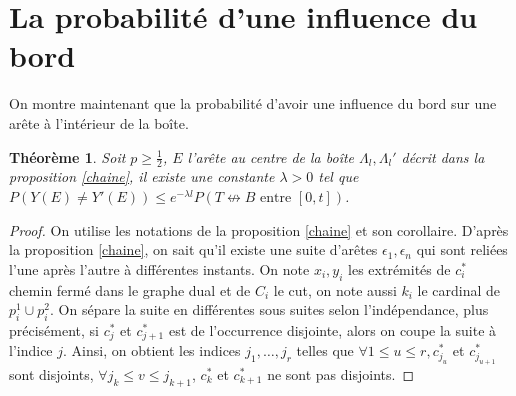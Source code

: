 \documentclass[titlepage,a4paper,11pt]{article}
\newcounter{thm}
\newcounter{prop}
\newcounter{cor}
\newtheorem{cvg}[thm]{Théorème}
\newcommand{\nconnect}{\nleftrightarrow}
\begin{document}
\section{La probabilité d'une influence du bord}

On montre maintenant que la probabilité d'avoir une influence du bord sur une arête à l'intérieur de la boîte. 
\begin{cvg}
Soit $p\geqslant \frac{1}{2}$, $E$ l'arête au centre de la boîte $\Lambda_l, \Lambda_l'$ décrit dans la proposition \ref{chaine}, il existe une constante $\lambda> 0$ tel que $P(Y(E)\neq Y'(E)) \leqslant e^{-\lambda l} P(T\nconnect B \text{ entre }[0,t])$.
\end{cvg}

\begin{proof}

On utilise les notations de la proposition \ref{chaine} et son corollaire.
D'après la proposition \ref{chaine}, on sait qu'il existe une suite d'arêtes $\epsilon_1,\epsilon_n$ qui sont reliées l'une après l'autre à différentes instants. On note $x_i,y_i$ les extrémités de $c_i^*$ chemin fermé dans le graphe dual et de $C_i$ le cut, on note aussi $k_i$ le cardinal de $p_i^1\cup p_i^2$. On sépare la suite en différentes sous suites selon l'indépendance, plus précisément, si $c^*_j$ et $c^*_{j+1}$  est de l'occurrence disjointe, alors on coupe la suite à l'indice $j$. Ainsi, on obtient les indices $j_1,\dots,j_r$ telles que $\forall 1\leqslant u\leqslant r, c^*_{j_u}$ et $c^*_{j_{u+1}}$ sont disjoints, $\forall j_k \leqslant v \leqslant j_{k+1}$, $c_k^*$ et $c_{k+1}^*$ ne sont pas disjoints.


\end{proof}
\end{document}
